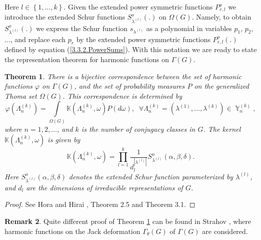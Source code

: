 \documentclass[12pt]{amsart}
\newtheorem{thm}{Theorem}[section]
\theoremstyle{definition}
\newtheorem{rem}[thm]{Remark}
\numberwithin{equation}{section}
\DeclareMathOperator{\Y}{\mathbb{Y}}
\begin{document}
Here $l\in\left\{1,\ldots,k\right\}$.
Given the extended power symmetric functions $P_{r,l}^{o}$ we introduce
the extended Schur functions $S_{\lambda^{(l)}}^{o}(.)$ on $\Omega\left(G\right)$.  Namely, to obtain $S_{\lambda^{(l)}}^{o}(.)$  we express the Schur function
$s_{\lambda^{(l)}}$ as a polynomial in variables $p_1$, $p_2$, $\ldots$,
and replace each $p_r$ by the extended power symmetric functions $P_{r,l}^{o}(.)$ defined by equation (\ref{3.3.2.PowerSums}).
With this notation we are ready to state the representation theorem for harmonic functions on $\Gamma\left(G\right)$.
\begin{thm}\label{THEOREMANALOGTHOMA}
There is a bijective correspondence between the set of  harmonic functions $\varphi$ on $\Gamma(G)$, and the set of  probability measures $P$ on the generalized Thoma set $\Omega(G)$. This correspondence is determined by
\begin{equation}\label{HarmonicFunctionProbabilityMeasure}
\varphi\left(\Lambda_n^{(k)}\right)=\int\limits_{\Omega(G)}\mathbb{K}\left(\Lambda_n^{(k)},\omega\right)P(d\omega),\;\;\forall \Lambda_n^{(k)}=\left(\lambda^{(1)},\ldots,\lambda^{(k)}\right)\in\Y_n^{(k)},
\end{equation}
where $n=1,2,...$, and $k$ is the number of conjugacy classes in $G$.
 The  kernel $\mathbb{K}\left(\Lambda_n^{(k)},\omega\right)$ is given by
\begin{equation}\label{LimitingMartinKernel}
\mathbb{K}\left(\Lambda_n^{(k)},\omega\right)=\prod\limits_{l=1}^k\frac{1}{d_l^{|\lambda^{(l)}|}}
S_{\lambda^{(l)}}^{o}\left(\alpha,\beta,\delta\right).
\end{equation}
Here $S_{\lambda^{(l)}}^{o}\left(\alpha,\beta,\delta\right)$ denotes the extended Schur function parameterized by $\lambda^{(l)}$, and $d_l$ are the dimensions of irreducible representations of $G$.
\end{thm}
\begin{proof}See Hora and Hirai \cite{HoraHirai}, Theorem 2.5 and Theorem 3.1.
\end{proof}
\begin{rem} Quite different proof of Theorem \ref{THEOREMANALOGTHOMA} can be found in Strahov \cite{StrahovMPS}, where harmonic functions on the Jack deformation $\Gamma_{\theta}\left(G\right)$ of $\Gamma\left(G\right)$ are considered.
\end{rem}
\end{document}
